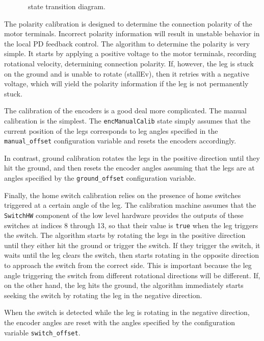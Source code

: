 \begin{figure}[!ht]
  \centering
  \caption{\CalibMachine\ state transition diagram.}
  \label{fig:calibmachine}
\end{figure}

The polarity calibration is designed to determine the connection polarity of
the motor terminals. Incorrect polarity information will result in unstable
behavior in the local PD feedback control. The algorithm to determine the
polarity is very simple. It starts by applying a positive voltage to the
motor terminals, recording rotational velocity, determining connection
polarity. If, however, the leg is stuck on the ground and is unable to
rotate (stallEv), then it retries with a negative voltage, which will yield
the polarity information if the leg is not permanently stuck.

The calibration of the encoders is a good deal more complicated. The manual
calibration is the simplest. The {\tt encManualCalib} state simply assumes
that the current position of the legs corresponds to leg angles specified in
the {\tt manual\_offset} configuration variable and resets the encoders
accordingly.

In contrast, ground calibration rotates the legs in the positive direction
until they hit the ground, and then resets the encoder angles assuming that
the legs are at angles specified by the {\tt ground\_offset} configuration
variable.

Finally, the home switch calibration relies on the presence of home switches
triggered at a certain angle of the leg. The calibration machine assumes
that the {\tt SwitchHW} component of the low level hardware provides the
outputs of these switches at indices 8 through 13, so that their value is
{\tt true} when the leg triggers the switch. The algorithm starts by
rotating the legs in the positive direction until they either hit the ground
or trigger the switch. If they trigger the switch, it waits until the leg
clears the switch, then starts rotating in the opposite direction to
approach the switch from the correct side. This is important because the leg
angle triggering the switch from different rotational directions will be
different. If, on the other hand, the leg hits the ground, the algorithm
immediately starts seeking the switch by rotating the leg in the negative
direction. 

When the switch is detected while the leg is rotating in the negative
direction, the encoder angles are reset with the angles specified by the
configuration variable {\tt switch\_offset}.


